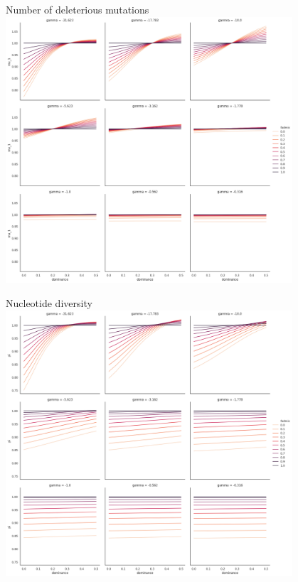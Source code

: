 \documentclass[10pt]{beamer}
\begin{document}
\begin{frame}[t]{Number of deleterious mutations}
  \vfill
  \centering
  \includegraphics[width=0.8\textwidth]{./Figures/mu_1.png}
\end{frame}

\begin{frame}[t]{Nucleotide diversity}
  \vfill
  \centering
  \includegraphics[width=0.8\textwidth]{./Figures/pi.png}
\end{frame}
\end{document}
